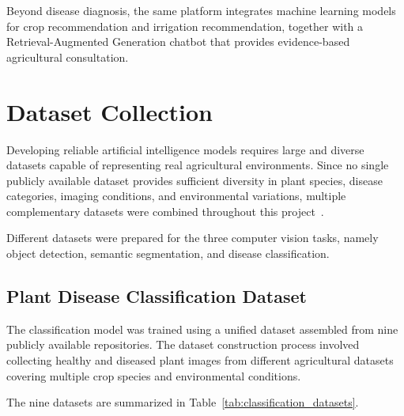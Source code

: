 Beyond disease diagnosis, the same platform integrates machine learning models for crop recommendation and irrigation recommendation, together with a Retrieval-Augmented Generation chatbot that provides evidence-based agricultural consultation.

\section{Dataset Collection}
\label{sec:dataset_collection}

Developing reliable artificial intelligence models requires large and diverse datasets capable of representing real agricultural environments. Since no single publicly available dataset provides sufficient diversity in plant species, disease categories, imaging conditions, and environmental variations, multiple complementary datasets were combined throughout this project~\cite{mohanty2016,plantdoc2020}.

Different datasets were prepared for the three computer vision tasks, namely object detection, semantic segmentation, and disease classification.

\subsection{Plant Disease Classification Dataset}

The classification model was trained using a unified dataset assembled from nine publicly available repositories. The dataset construction process involved collecting healthy and diseased plant images from different agricultural datasets covering multiple crop species and environmental conditions.

The nine datasets are summarized in Table~\ref{tab:classification_datasets}.


